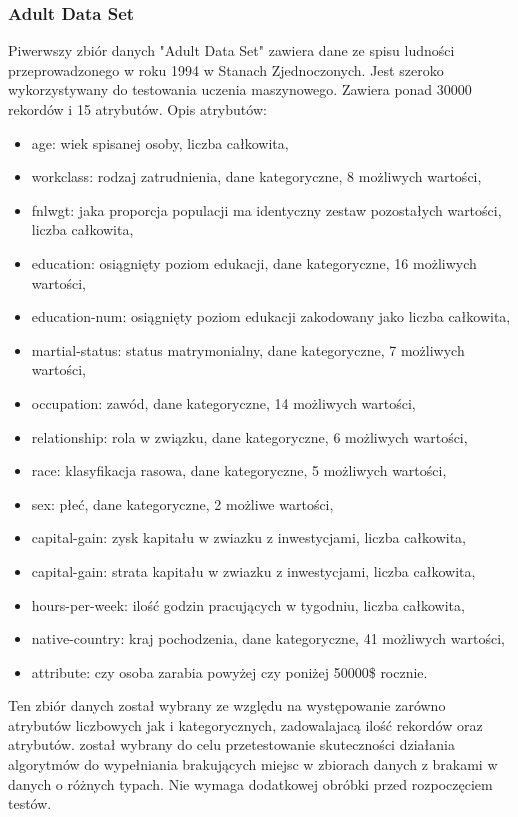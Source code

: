 \documentclass[12pt,twoside]{article}
\begin{document}
\subsubsection{Adult Data Set}

Piwerwszy zbiór danych "Adult Data Set" zawiera dane ze spisu ludności przeprowadzonego w roku 1994 w Stanach Zjednoczonych.
Jest szeroko wykorzystywany do testowania uczenia maszynowego.
Zawiera ponad 30000 rekordów i 15 atrybutów. \cite{adult} Opis atrybutów:

\begin{itemize}[label=-,labelsep=0.4cm, leftmargin=1.25cm]
    \item age: wiek spisanej osoby, liczba całkowita,
    \item workclass: rodzaj zatrudnienia, dane kategoryczne, 8 możliwych wartości,
    \item fnlwgt: jaka proporcja populacji ma identyczny zestaw pozostałych wartości, liczba całkowita,
    \item education: osiągnięty poziom edukacji, dane kategoryczne, 16 możliwych wartości,
    \item education-num: osiągnięty poziom edukacji zakodowany jako liczba całkowita,
    \item martial-status: status matrymonialny, dane kategoryczne, 7 możliwych wartości,
    \item occupation: zawód, dane kategoryczne, 14 możliwych wartości,
    \item relationship: rola w związku, dane kategoryczne, 6 możliwych wartości,
    \item race: klasyfikacja rasowa, dane kategoryczne, 5 możliwych wartości,
    \item sex: płeć, dane kategoryczne, 2 możliwe wartości,
    \item capital-gain: zysk kapitału w zwiazku z inwestycjami, liczba całkowita,
    \item capital-gain: strata kapitału w zwiazku z inwestycjami, liczba całkowita,
    \item hours-per-week: ilość godzin pracujących w tygodniu, liczba całkowita,
    \item native-country: kraj pochodzenia, dane kategoryczne, 41 możliwych wartości,
    \item attribute: czy osoba zarabia powyżej czy poniżej 50000\$ rocznie.
\end{itemize}

Ten zbiór danych został wybrany ze względu na występowanie zarówno atrybutów liczbowych jak i kategorycznych,
zadowalajacą ilość rekordów oraz atrybutów.
został wybrany do celu przetestowanie skuteczności działania algorytmów do wypełniania brakujących miejsc
w zbiorach danych z brakami w danych o różnych typach.
Nie wymaga dodatkowej obróbki przed rozpoczęciem testów.
\end{document}
